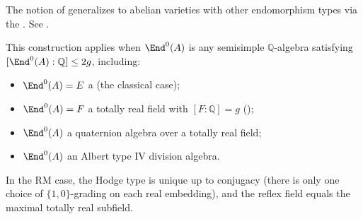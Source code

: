 \begin{remark} \label{remark:generalization_of_reflex_field_beyond_cm_fields}
    The notion of  generalizes to abelian varieties with other endomorphism types via the . See .

    This construction applies when $\End^0(A)$ is any semisimple $\mathbb{Q}$-algebra satisfying $[\End^0(A):\mathbb{Q}] \leq 2g$, including:
    \begin{itemize}
        \item $\End^0(A) = E$ a  (the classical case);
        \item $\End^0(A) = F$ a totally real field with $[F:\mathbb{Q}] = g$ ();
        \item $\End^0(A)$ a quaternion algebra over a totally real field;
        \item $\End^0(A)$ an Albert type IV division algebra.
    \end{itemize}

    In the RM case, the Hodge type is unique up to conjugacy (there is only one choice of $\{1,0\}$-grading on each real embedding), and the reflex field equals the maximal totally real subfield.
\end{remark}
